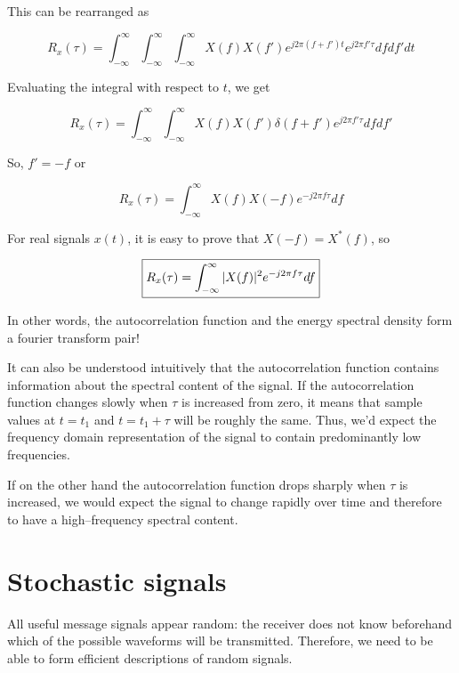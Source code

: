 This can be rearranged as

\begin{equation}
R_x(\tau) = \int_{-\infty}^{\infty}  \int_{-\infty}^{\infty} \int_{-\infty}^{\infty} X(f)X(f') e^{j 2 \pi (f+f') t}   e^{j 2 \pi f' \tau} df df' dt
\end{equation} 

Evaluating the integral with respect to $t$, we get

\begin{equation}
R_x(\tau) = \int_{-\infty}^{\infty}  \int_{-\infty}^{\infty}  X(f)X(f') \delta(f+f')   e^{j 2 \pi f' \tau} df df'
\end{equation} 

So, $f'=-f$ or

\begin{equation}
R_x(\tau) = \int_{-\infty}^{\infty} X(f)X(-f) e^{-j 2 \pi f \tau} df 
\end{equation} 

For real signals $x(t)$, it is easy to prove that $X(-f)=X^*(f)$, so

\begin{equation}
\fbox{$\displaystyle
R_x(\tau) = \int_{-\infty}^{\infty} |X(f)|^2 e^{-j 2 \pi f \tau} df \label{eq-wiener}
$}
\end{equation} 

In other words, the autocorrelation function and the energy spectral density form a fourier transform pair!

It can also be understood intuitively that the autocorrelation function contains information about the spectral content of the signal. If the autocorrelation function changes slowly when $\tau$ is increased from zero, it means that sample values at $t=t_1$ and $t=t_1+\tau$ will be roughly the same. Thus, we'd expect the frequency domain representation of the signal to contain predominantly low frequencies.

If on the other hand the autocorrelation function drops sharply when $\tau$ is increased, we would expect the signal to change rapidly over time and therefore to have a high--frequency spectral content.

\section{Stochastic signals}

All useful message signals appear random: the receiver does not know beforehand which of the possible waveforms will be transmitted. Therefore, we need to be able to form efficient descriptions of random signals.

